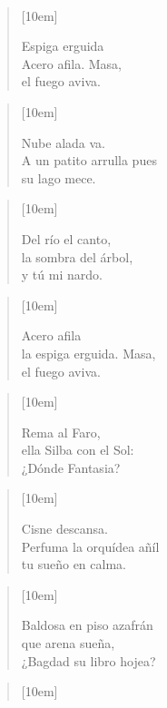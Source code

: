 \\[0.1cm]

\begin{verse}[10em]
	\begin{altverse}
		Espiga erguida\\
		Acero afila. Masa,\\
		el fuego aviva.\\
	\end{altverse}
\end{verse}

\begin{verse}[10em]
	\begin{altverse}
		Nube alada va.\\
		A un patito arrulla pues\\
		su lago mece.\\
	\end{altverse}
\end{verse}

\begin{verse}[10em]
	\begin{altverse}
		Del río el canto,\\
		la sombra del árbol,\\
		y tú mi nardo.\\
	\end{altverse}
\end{verse}

\begin{verse}[10em]
	\begin{altverse}

		Acero afila\\
		la espiga erguida. Masa,\\
		el fuego aviva.\\
	\end{altverse}
\end{verse}

\begin{verse}[10em]
	\begin{altverse}
		Rema al Faro,\\
		ella Silba con el Sol:\\
		¿Dónde Fantasia?\\
	\end{altverse}
\end{verse}

\begin{verse}[10em]
	\begin{altverse}
		Cisne descansa.\\
		Perfuma la orquídea añíl\\
		tu sueño en calma.\\
	\end{altverse}
\end{verse}

\begin{verse}[10em]
	\begin{altverse}
		Baldosa en piso azafrán\\
		que arena sueña,\\
		¿Bagdad su libro hojea?\\
	\end{altverse}
\end{verse}

\begin{verse}[10em]
	\begin{altverse}
	\end{altverse}
\end{verse}
